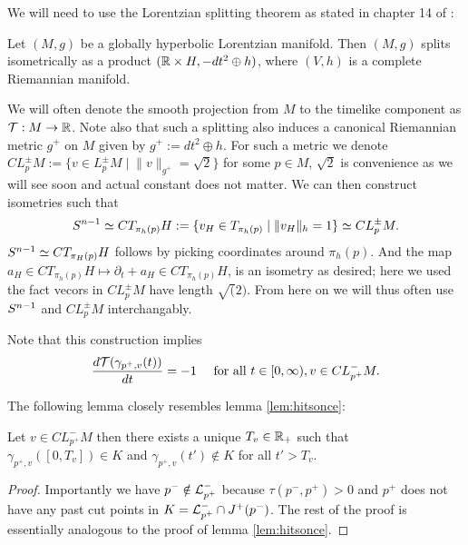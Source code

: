 We will need to use the Lorentzian splitting theorem as stated in chapter 14 of \cite{beem}:
\begin{theorem} Let $(M,g)$ be a globally hyperbolic Lorentzian manifold. Then $(M,g)$ splits isometrically as a product $(\mathbb{R}\times H,-dt^2\oplus h)$, where $(V,h)$ is a complete Riemannian manifold.
\end{theorem}
We will often denote the smooth projection from $M$ to the timelike component as ${\mathcal{T}}:M\to \mathbb{R}$. Note also that such a splitting also induces a canonical Riemannian metric $g^+$ on $M$ given by $g^+ := dt^2 \oplus h$. For such a metric we denote $CL^\pm_p M:=\{v\in L^\pm_pM\mid \lVert v \rVert_{g^+}=\sqrt{2} \}$ for some $p\in M$, $\sqrt{2}$ is convenience as we will see soon and actual constant does not matter. We can then construct isometries such that
\begin{equation}\label{eq:CEQSN}
    {S^{n-1}} \simeq CT_{\pi_h(p)}H := \{v_H\in T_{\pi_h(p)}\mid \lVert v_H \rVert_h =1 \} \simeq CL^\pm_pM.
\end{equation} ${S^{n-1}} \simeq CT_{\pi_H(p)}H$ follows by picking coordinates around $\pi_h(p)$. And the map $a_H\in CT_{\pi_h(p)}H \mapsto \partial_t + a_H \in CT_{\pi_h(p)}H$, is an isometry as desired; here we used the fact vecors in $CL^\pm_p M$ have length $\sqrt(2)$. From here on we will thus often use ${S^{n-1}}$ and $CL^\pm_pM$ interchangably.

Note that this construction implies 
\begin{equation}\label{eq:constspeed}
    \frac{d{\mathcal{T}}(\gamma_{p^+,v}(t))}{dt} = -1 \quad \text{ for all }t\in [0,\infty), v\in CL^-_{p^+}M.
\end{equation}

The following lemma closely resembles lemma \ref{lem:hitsonce}:
\begin{lemma}\label{lem:Tvdef}
    Let $v\in CL^-_{p^+}M$ then there exists a unique $T_v\in \mathbb{R}_+$ such that $\gamma_{p^+,v}([0,T_v])\in K$ and $\gamma_{p^+,v}(t')\notin K$ for all $t'>T_v$.
\end{lemma}
\begin{proof}
    Importantly we have $p^-\notin {\mathcal{L}}^-_{p^+}$ because $\tau(p^-,p^+)>0$ and $p^+$ does not have any past cut points in $K={\mathcal{L}}^-_{p^+}\cap J^+(p^-)$. The rest of the proof is essentially analogous to the proof of lemma \ref{lem:hitsonce}.
\end{proof}

